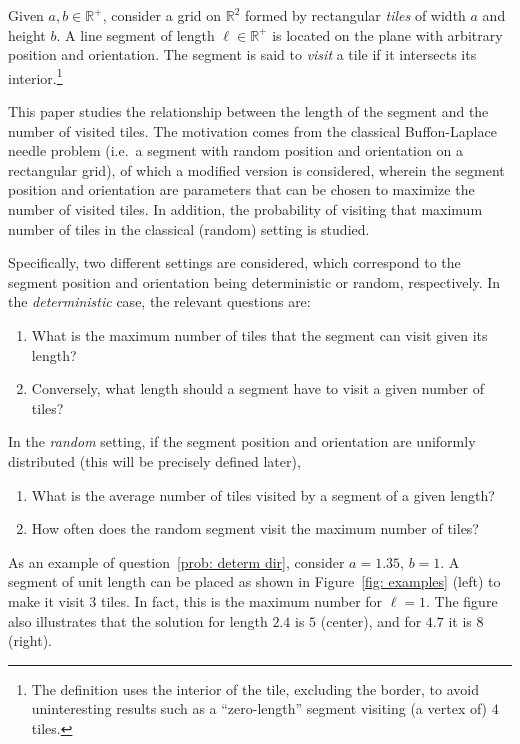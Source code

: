 \documentclass[12pt, a4paper]{article}
\makeatletter
\newcommand{\len}{\ell} %
\renewcommand\theenumi{(\@roman\c@enumi)} %
\renewcommand\labelenumi{\theenumi} %
\makeatother
\begin{document}
Given $a, b \in \mathbb R^+$, consider a grid on $\mathbb R^2$ formed by rectangular \emph{tiles} of width $a$ and height $b$. A line segment of length $\len \in \mathbb R^+$ is located on the plane with arbitrary position and orientation. The segment is said to \emph{visit} a tile if it intersects its interior.\footnote{
The definition uses the interior of the tile, excluding the border, to avoid uninteresting results such as a ``zero-length'' segment visiting (a vertex of) $4$ tiles.}

This paper studies the relationship between the length of the segment and the number of visited tiles. The motivation comes from the classical Buffon-Laplace needle problem (i.e.~a segment with random position and orientation on a rectangular grid), of which a modified version is considered, wherein the segment position and orientation are parameters that can be chosen to maximize the number of visited tiles. In addition, the probability of visiting that maximum number of tiles in the classical (random) setting is studied.

Specifically, two different settings are considered, which correspond to the segment position and orientation being deterministic or random, respectively. In the \emph{deterministic} case, the relevant questions are:
\begin{enumerate}
\renewcommand{\labelenumi}{(1\alph{enumi})}
\renewcommand{\theenumi}{(1\alph{enumi})}
\item
\label{prob: determ dir}
What is the maximum number of tiles that the segment can visit given its length?
\item
\label{prob: determ inv}
Conversely, what length should a segment have to visit a given number of tiles?
\end{enumerate}

In the \emph{random} setting, if the segment position and orientation are uniformly distributed (this will be precisely defined later),
\begin{enumerate}
\renewcommand{\labelenumi}{(2\alph{enumi})}
\renewcommand{\theenumi}{(2\alph{enumi})}
\item
\label{prob: rand ave}
What is the average number of tiles visited by a segment of a given length?
\item
\label{prob: rand prob}
How often does the random segment visit the maximum number of tiles?
\end{enumerate}

As an example of question~\ref{prob: determ dir}, consider $a=1.35$, $b=1$. A segment of unit length can be placed as shown in Figure~\ref{fig: examples} (left) to make it visit $3$ tiles. In fact, this is the maximum number for $\len=1$. The figure also illustrates that the solution for length $2.4$ is $5$ (center), and for $4.7$ it is $8$ (right).
\end{document}

